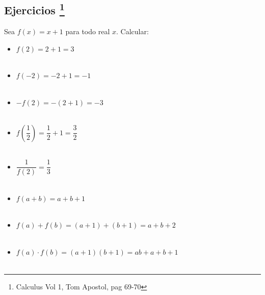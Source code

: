  



\subsection[Ejercicios]{Ejercicios \footnote{Calculus Vol 1, Tom Apostol, pag 69-70}}
\begin{ej}
Sea $f(x)=x+1$ para todo real $x$. Calcular:
\begin{itemize}
\item $f(2) = 2+1 = 3$\\\\
\item $f(-2) = -2 +1 = -1$\\\\
\item $-f(2) = -(2+1)=-3$\\\\
\item $f \left( \dfrac{1}{2} \right) = \dfrac{1}{2} + 1 = \dfrac{3}{2}$\\\\
\item $\dfrac{1}{f(2)}= \dfrac{1}{3}$\\\\
\item $f(a+b) = a+b+1$\\\\
\item $f(a)+f(b)= (a+1) + (b+1) = a+b+2$\\\\
\item $f(a) \cdot f(b) = (a+1)(b+1) = ab + a + b + 1$\\\\
\end{itemize}
\end{ej}

